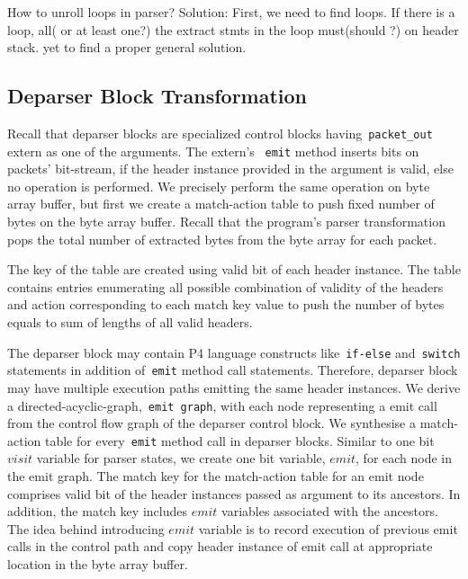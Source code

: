 How to unroll loops in parser? 
Solution: First, we need to find loops. 
If there is a loop, all( or at least one?) the extract stmts in the loop must(should ?) on header stack.
yet to find a proper general solution.


\subsection{Deparser Block Transformation}
\label{subsection:deparser-block-transformation}
Recall that deparser blocks are specialized control blocks having~\texttt{packet\_out} extern as one of the arguments.
The extern's ~\texttt{emit} method inserts bits on packets' bit-stream, if the header instance provided in the argument is valid, else no operation is performed.
We precisely perform the same operation on byte array buffer, but first we create a match-action table to push fixed number of bytes on the byte array buffer.
Recall that the program's parser transformation pops the total number of extracted bytes from the byte array for each packet.

The key of the table are created using valid bit of each header instance.
The table contains entries enumerating all possible combination of validity of the headers and action corresponding to each match key value to push the number of bytes equals to sum of lengths of all valid headers.


The deparser block may contain P4 language constructs like~\texttt{if-else} and~\texttt{switch} statements in addition of~\texttt{emit} method call statements.
Therefore, deparser block may have multiple execution paths emitting the same header instances. 
We derive a directed-acyclic-graph,~\texttt{emit graph}, with each node representing a emit call from the control flow graph of the deparser control block.
We synthesise a match-action table for every~\texttt{emit} method call in deparser blocks.
Similar to one bit $visit$ variable for parser states, we create one bit variable, $emit$, for each node in the emit graph.
The match key for the match-action table for an emit node comprises valid bit of the header instances passed as argument to its ancestors.
In addition, the match key includes $emit$ variables associated with the ancestors.
The idea behind introducing $emit$ variable is to record execution of previous emit calls in the control path and copy header instance  of emit call at appropriate location in the byte array buffer.



